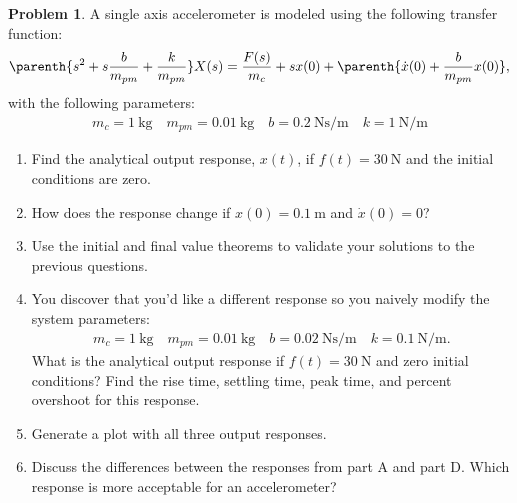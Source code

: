 \documentclass[10pt]{article}
\theoremstyle{definition}
\newtheorem{prob}{Problem}[section]
\newenvironment{subprob}%
{\renewcommand{\theenumi}{\alph{enumi}}\renewcommand{\labelenumi}{(\theenumi)}\begin{enumerate}}%
{\end{enumerate}}%
\begin{document}
\begin{prob}
    A single axis accelerometer is modeled using the following transfer function:
    \begin{align}
        \parenth{s^2 + s\frac{b}{m_{pm}} + \frac{k}{m_{pm}}} X(s) = \frac{F(s)}{m_c} + s x(0) + \parenth{\dot{x}(0) + \frac{b}{m_{pm}} x(0)},
    \end{align}
    with the following parameters:
    \begin{align*}
        m_c = \SI{1}{\kilo\gram} \quad m_{pm} = \SI{0.01}{\kilo\gram} \quad b = \SI{0.2}{\newton\second\per\meter} \quad k = \SI{1}{\newton\per\meter}
    \end{align*}

    \begin{subprob}
        \item Find the analytical output response, \( x(t) \), if \( f(t) = \SI{30}{\newton}\) and the initial conditions are zero.
        \item How does the response change if \( x(0) = \SI{0.1}{\meter} \) and \( \dot{x}(0) = 0 \)?
        \item Use the initial and final value theorems to validate your solutions to the previous questions.
        \item You discover that you'd like a different response so you naively modify the system parameters:
            \begin{align*}
        m_c = \SI{1}{\kilo\gram} \quad m_{pm} = \SI{0.01}{\kilo\gram} \quad b = \SI{0.02}{\newton\second\per\meter} \quad k = \SI{0.1}{\newton\per\meter}.
            \end{align*}
            What is the analytical output response if \( f(t) = \SI{30}{\newton} \) and zero initial conditions?
            Find the rise time, settling time, peak time, and percent overshoot for this response.
        \item Generate a plot with all three output responses.
        \item Discuss the differences between the responses from part A and part D.
            Which response is more acceptable for an accelerometer?
    \end{subprob}
\end{prob}
  
\end{document}
